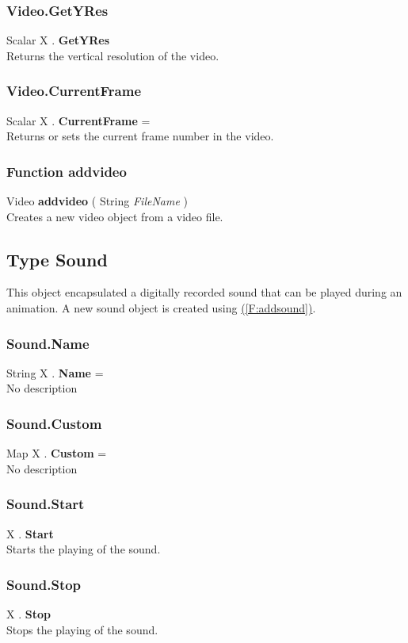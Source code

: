 \documentclass[10pt]{book}
\newcommand{\linkitem}[1]{\hyperref[#1]{\nameref{#1} (\ref{#1})}}
\begin{document}
\subsubsection{Video.GetYRes \label{F:Video:GetYRes}}
Scalar X . \textbf{GetYRes} \\
Returns the vertical resolution of the video.

\subsubsection{Video.CurrentFrame \label{F:Video:CurrentFrame}}
Scalar X . \textbf{CurrentFrame} = \\
Returns or sets the current frame number in the video.

\subsubsection{Function addvideo \label{F:addvideo}}
Video \textbf{addvideo} ( String \textit{FileName} ) \\
Creates a new video object from a video file.

\subsection{Type Sound \label{T:Sound}}
This object encapsulated a digitally recorded sound that can be played during an animation. A new sound object is created using \linkitem{F:addsound}.

\subsubsection{Sound.Name \label{F:Sound:Name}}
String X . \textbf{Name} = \\
No description

\subsubsection{Sound.Custom \label{F:Sound:Custom}}
Map X . \textbf{Custom} = \\
No description

\subsubsection{Sound.Start \label{F:Sound:Start}}
X . \textbf{Start} \\
Starts the playing of the sound.

\subsubsection{Sound.Stop \label{F:Sound:Stop}}
X . \textbf{Stop} \\
Stops the playing of the sound.
\end{document}
